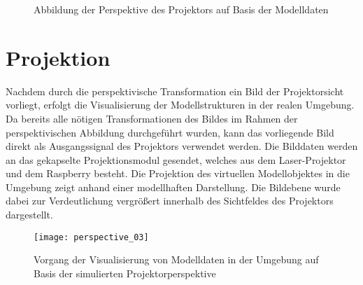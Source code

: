\begin{figure}[!ht]
	\begin{center}
	\hspace{5mm}
	\caption{Abbildung der Perspektive des Projektors auf Basis der Modelldaten}
	\label{fig.projpersp_gui}
	\end{center}
\end{figure}%
%
%
%
%
\section{Projektion}
\label{chap.projection}
Nachdem durch die perspektivische Transformation ein Bild der Projektorsicht vorliegt, erfolgt die Visualisierung der Modellstrukturen in der realen Umgebung. Da bereits alle nötigen Transformationen des Bildes im Rahmen der perspektivischen Abbildung durchgeführt wurden, kann das vorliegende Bild direkt als Ausgangssignal des Projektors verwendet werden. Die Bilddaten werden an das gekapselte Projektionsmodul gesendet, welches aus dem Laser-Projektor und dem Raspberry besteht. Die Projektion des virtuellen Modellobjektes in die Umgebung zeigt  anhand einer modellhaften Darstellung. 
Die Bildebene wurde dabei zur Verdeutlichung vergrößert innerhalb des Sichtfeldes des Projektors dargestellt. 

\clearpage{}

\begin{figure}[!ht]
	\begin{center}
		\texttt{[image: perspective\_03]}
		\caption{Vorgang der Visualisierung von Modelldaten in der Umgebung auf Basis der simulierten Projektorperspektive}
		\label{fig.perspproj}
	\end{center}
\end{figure}

